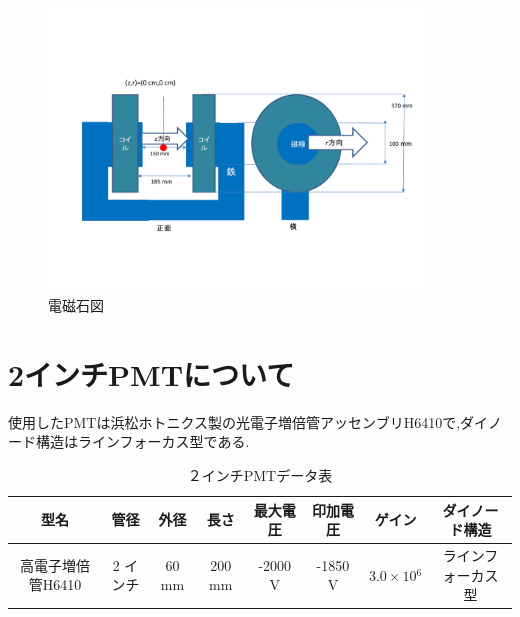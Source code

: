 \begin{figure}[H]
	\centering
		\includegraphics[width=10cm]{fig/iguchi/magnetfigure.pdf}
	\caption{電磁石図}
	\label{magnetfigure}
\end{figure}


\section{2インチPMTについて}
使用したPMTは浜松ホトニクス製の光電子増倍管アッセンブリH6410で,ダイノード構造はラインフォーカス型である.\cite{pmtH6410}

\begin{table}[htb]
	\centering
	
	  \begin{tabular}{cccccccc}\hline
		型名& 管径 & 外径 & 長さ & 最大電圧 & 印加電圧 & ゲイン & ダイノード構造 \\ \hline \hline
		高電子増倍管H6410 & 2 インチ & 60 mm & 200 mm & -2000 V & -1850 V & $3.0\times10{^{6}}$ &ラインフォーカス型 \\ \hline
	\end{tabular}
	  \caption{２インチPMTデータ表}
\end{table}

